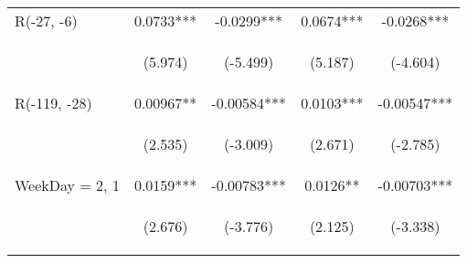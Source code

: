 \documentclass[]{standalone}
\begin{document}
\begin{tabular}{lcccc}
    R(-27, -6)       & 0.0733***                                      & -0.0299***                                     & 0.0674***                                      & -0.0268***                                     \\
    \vspace{4pt}     & \begin{footnotesize}(5.974)\end{footnotesize}  & \begin{footnotesize}(-5.499)\end{footnotesize} & \begin{footnotesize}(5.187)\end{footnotesize}  & \begin{footnotesize}(-4.604)\end{footnotesize} \\
    R(-119, -28)     & 0.00967**                                      & -0.00584***                                    & 0.0103***                                      & -0.00547***                                    \\
    \vspace{4pt}     & \begin{footnotesize}(2.535)\end{footnotesize}  & \begin{footnotesize}(-3.009)\end{footnotesize} & \begin{footnotesize}(2.671)\end{footnotesize}  & \begin{footnotesize}(-2.785)\end{footnotesize} \\
    WeekDay = 2, 1   & 0.0159***                                      & -0.00783***                                    & 0.0126**                                       & -0.00703***                                    \\
    \vspace{4pt}     & \begin{footnotesize}(2.676)\end{footnotesize}  & \begin{footnotesize}(-3.776)\end{footnotesize} & \begin{footnotesize}(2.125)\end{footnotesize}  & \begin{footnotesize}(-3.338)\end{footnotesize} \\

\end{tabular}
\end{document}
